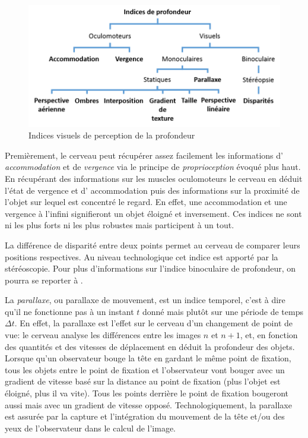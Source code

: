 	\begin{figure}[h]
		\centering
		\includegraphics[scale=1]{Figures/IndicesProfondeur}
		\caption{Indices visuels de perception de la profondeur}
		\label{fig:indices_profondeur}
	\end{figure}
	
	\par Premièrement, le cerveau peut récupérer assez facilement les informations d' \textit{accommodation} et de \textit{vergence} via le principe de \textit{proprioception} évoqué plus haut. En récupérant des informations sur les muscles oculomoteurs le cerveau en déduit l'état de vergence et d' accommodation puis des informations sur la proximité de l'objet sur lequel est concentré le regard. En effet, une accommodation et une vergence à l'infini signifieront un objet éloigné et inversement. Ces indices ne sont ni les plus forts ni les plus robustes mais participent à un tout.
	
	\par La différence de disparité entre deux points permet au cerveau de comparer leurs positions respectives. Au niveau technologique cet indice est apporté par la stéréoscopie. Pour plus d'informations sur l'indice binoculaire de profondeur, on pourra se reporter à \citep{glassner_principles_1995}.
	
	\par La \textit{parallaxe}, ou parallaxe de mouvement, est un indice temporel, c'est à dire qu'il ne fonctionne pas à un instant $t$ donné mais plutôt sur une période de temps $\Delta t$. En effet, la parallaxe est l'effet sur le cerveau d'un changement de point de vue: le cerveau analyse les différences entre les images $n$ et $n+1$, et, en fonction des quantités et des vitesses de déplacement en déduit la profondeur des objets. Lorsque qu'un observateur bouge la tête en gardant le même point de fixation, tous les objets entre le point de fixation et l'observateur vont bouger avec un gradient de vitesse basé sur la distance au point de fixation (plus l'objet est éloigné, plus il va vite). Tous les points derrière le point de fixation bougeront aussi mais avec un gradient de vitesse opposé. Technologiquement, la parallaxe est assurée par la capture et l'intégration du mouvement de la tête et/ou des yeux de l'observateur dans le calcul de l'image.
	
